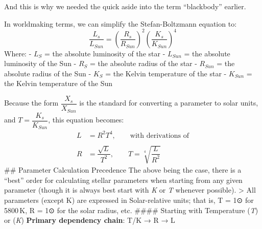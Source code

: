 \documentclass[
  letterpaper,
]{book}
\begin{document}
And this is why we needed the quick aside into the term ``blackbody''
earlier.

In worldmaking terms, we can simplify the Stefan-Boltzmann equation to:
\[
\dfrac{L_s}{L_{Sun}} = \left(\dfrac{R_s}{R_{Sun}}\right)^2 \left(\dfrac{K_s}{K_{Sun}}\right)^4
\] Where: - \(L_S\) = the absolute luminosity of the star - \(L_{Sun}\)
= the absolute luminosity of the Sun - \(R_S\) = the absolute radius of
the star - \(R_{Sun}\) = the absolute radius of the Sun - \(K_S\) = the
Kelvin temperature of the star - \(K_{Sun}\) = the Kelvin temperature of
the Sun

Because the form \(\dfrac{X_s}{X_{Sun}}\) is the standard for converting
a parameter to solar units, and \(T = \dfrac{K_s}{K_{Sun}}\), this
equation becomes: \[
\begin{align}
L &= R^2T^4, \qquad \text{with derivations of} \\ \\
R &= \dfrac{\sqrt{L}}{T^2}, \qquad
T = \sqrt[4]{\dfrac{L}{R^2}}
\end{align}
\] \#\# Parameter Calculation Precedence The above being the case, there
is a ``best'' order for calculating stellar parameters when starting
from any given parameter (though it is always best start with \emph{K}
or \emph{T} whenever possible). \textgreater{} All parameters (except K)
are expressed in Solar-relative units; that is, T = 1⊙ for 5800\,K, R =
1⊙ for the solar radius, etc. \#\#\#\# Starting with Temperature
(\emph{T}) or (\emph{K}) \textbf{Primary dependency chain}: T/K → R → L
\end{document}
